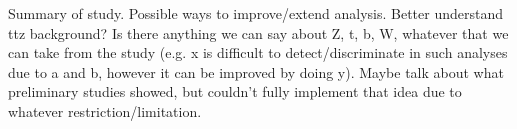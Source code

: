  
Summary of study. Possible ways to improve/extend analysis. Better understand ttz background? Is there anything we can say about Z, t, b, W, whatever that we can take from the study (e.g. x is difficult to detect/discriminate in such analyses due to a and b, however it can be improved by doing y). Maybe talk about what preliminary studies showed, but couldn't fully implement that idea due to whatever restriction/limitation.
